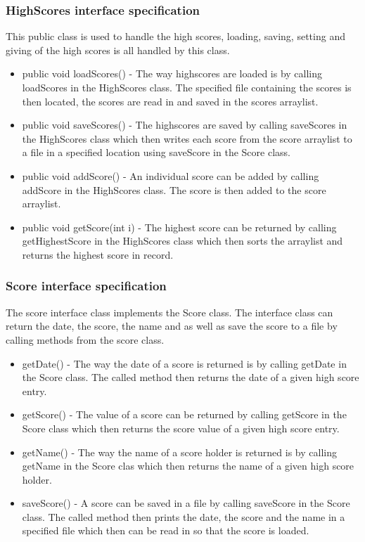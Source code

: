         \subsubsection{HighScores interface specification} %
        This public class is used to handle the high scores, loading, saving, setting and giving of the high scores is all handled by this class.
        \begin{itemize}
        	\item public void loadScores() - The way highscores are loaded is by calling loadScores in the HighScores class.  The specified file containing the scores is then located, the scores are read in and saved in the scores arraylist.
            \item public void saveScores() - The highscores are saved by calling saveScores in the HighScores class which then writes each score from the score arraylist to a file in a specified location using saveScore in the Score class.
            \item public void addScore() - An individual score can be added by calling addScore in the HighScores class. The score is then added to the score arraylist.
            \item public void getScore(int i) - The highest score can be returned by calling getHighestScore in the HighScores class which then sorts the arraylist and returns the highest score in record.
        \end{itemize}
        \subsubsection{Score interface specification} %
        The score interface class implements the Score class. The interface class can return the date, the score, the name and as well as save the score to a file by calling methods from the score class.
        \begin{itemize}
        	\item getDate() - The way the date of a score is returned is by calling getDate in the Score class. The called method then returns the date of a given high score entry.
            \item getScore() - The value of a score can be returned by calling getScore in the Score class which then returns the score value of a given high score entry.
            \item getName() - The way the name of a score holder is returned is by calling getName in the Score clas which then returns the name of a given high score holder.
            \item saveScore() - A score can be saved in a file by calling saveScore in the Score class. The called method then prints the date, the score and the name in a specified file which then can be read in so that the score is loaded.
        \end{itemize}    
